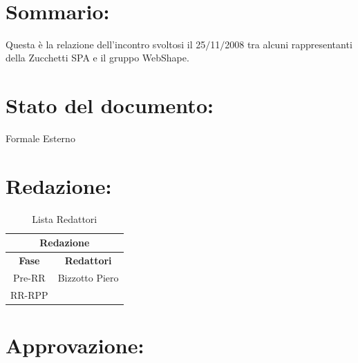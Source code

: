 \newpage

\begin{center} %
	\begin{Huge}	
				\textbf{\TITOLODOC}			\\
	\end{Huge}
\end{center}

\section*{\LARGE Sommario:} %
\indent \indent
Questa \`e la relazione dell'incontro svoltosi il 25$\slash$11$\slash$2008 tra alcuni rappresentanti della Zucchetti SPA e il gruppo WebShape.
\section*{\LARGE Stato del documento:}
\indent \indent
	Formale Esterno

\section*{\LARGE Redazione:}
	\begin{table}[!h]
		\begin{center}
			\begin{tabular}
				{|c|c|}
				\hline
				\multicolumn{2}{|c|}{ \textbf{Redazione} } \\
				\hline
				\textbf{Fase} & \textbf{Redattori} \\
				\hline
				{Pre-RR} &Bizzotto Piero \\
				\hline
				{RR-RPP} & \\
				\hline
			\end{tabular}
			\caption{Lista Redattori} %
		\label{tabredazione}
		\end{center}
	\end{table}
	
\section*{\LARGE Approvazione:}

